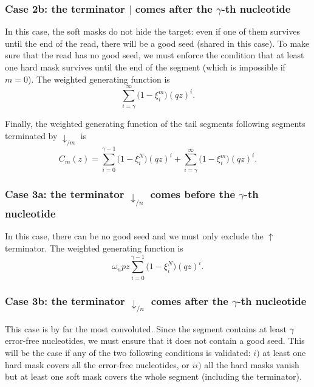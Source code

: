 \documentclass{article}
\begin{document}
\subsubsection*{Case 2b: the terminator $|$ comes after the $\gamma$-th
nucleotide}

In this case, the soft masks do not hide the target: even if one of them
survives until the end of the read, there will be a good seed (shared in
this case). To make sure that the read has no good seed, we must enforce
the condition that at least one hard mask survives until the end of the
segment (which is impossible if $m = 0$). The weighted generating function
is
\begin{equation*}
\sum_{i=\gamma}^\infty \Big(1 - \xi_i^m \Big) (qz)^i.
\end{equation*}

Finally, the weighted generating function of the tail segments following
segments terminated by $\downarrow_{/m}$ is
\begin{equation}
\label{eq:C}
C_m(z) =
\sum_{i=0}^{\gamma-1} \Big(1 - \xi_i^N \Big) (qz)^i +
  \sum_{i=\gamma}^\infty \Big(1 - \xi_i^m \Big) (qz)^i.
\end{equation}

\subsubsection*{Case 3a: the terminator $\downarrow_{/n}$ comes before the
$\gamma$-th nucleotide}

In this case, there can be no good seed and we must only exclude the
$\uparrow$ terminator. The weighted generating function is
\begin{equation}
\omega_n pz \sum_{i=0}^{\gamma-1} \Big(1 - \xi_i^N \Big) (qz)^i.
\end{equation}

\subsubsection*{Case 3b: the terminator $\downarrow_{/n}$ comes after the
$\gamma$-th nucleotide}

This case is by far the most convoluted. Since the segment contains at
least $\gamma$ error-free nucleotides, we must ensure that it does not
contain a good seed. This will be the case if any of the two following
conditions is validated: $i)$ at least one hard mask covers all the
error-free nucleotides, or $ii)$ all the hard masks vanish but at least
one soft mask covers the whole segment (including the terminator).
\end{document}
